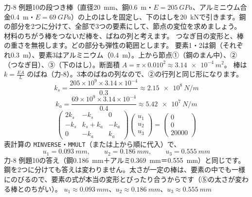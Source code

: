 \begin{phreidai}\label{ph:力-16:ex2}
力-8 例題10の段つき棒（直径\qty{20}{mm}、鋼\qty{0.6}{m}・$E=\qty{205}{GPa}$、アルミニウム合金\qty{0.4}{m}・$E=\qty{69}{GPa}$）の上のはしを固定し、下のはしを\qty{20}{kN}で引きます。鋼の部分を2つに分けて、全部で3つの要素にして、節点の変位を求めましょう。
\phbamen
材料のちがう棒をつないだ棒を、ばねの列と考えます。
\phmushi
つなぎ目の変形と、棒の重さを無視します。どの部分も弾性の範囲とします。
\phzu
要素1・2は鋼（それぞれ\qty{0.3}{m}）、要素3はアルミニウム（\qty{0.4}{m}）。上から節点①（鋼のまん中）、②（つなぎ目）、③（下のはし）。断面積 $A=\pi\times0.010^2\approx\qty{3.14e-4}{m^2}$。
\phriyu
棒は $k=\tfrac{EA}{L}$ のばね（力-8）。3本のばねの列なので、②の行列と同じ形になります。
\phtateru
\[k_s=\frac{205\times10^9\times3.14\times10^{-4}}{0.3}\approx\qty{2.15e8}{N/m}\]
\[k_a=\frac{69\times10^9\times3.14\times10^{-4}}{0.4}\approx\qty{5.42e7}{N/m}\]
\[\begin{pmatrix}2k_s&-k_s&0\\-k_s&k_s+k_a&-k_a\\0&-k_a&k_a\end{pmatrix}\begin{pmatrix}u_1\\u_2\\u_3\end{pmatrix}=\begin{pmatrix}0\\0\\\num{20000}\end{pmatrix}\]
\phtoku
表計算の \texttt{MINVERSE}・\texttt{MMULT}（または上から順に代入）で、
\[u_1=\qty{0.093}{mm},\qquad u_2=\qty{0.186}{mm},\qquad u_3=\qty{0.555}{mm}\]
\phtashikame
力-8 例題10の答え（鋼\qty{0.186}{mm}＋アルミ\qty{0.369}{mm}＝\qty{0.555}{mm}）と同じです。\\
鋼を2つに分けても答えは変わりません。太さが一定の棒は、要素の中でも一様にのびるので、要素の式が本当の変形とぴったり合うからです（⑤の太さが変わる棒とのちがい）。
\kotae $u_1\approx\qty{0.093}{mm}$、$u_2\approx\qty{0.186}{mm}$、$u_3\approx\qty{0.555}{mm}$
\end{phreidai}

